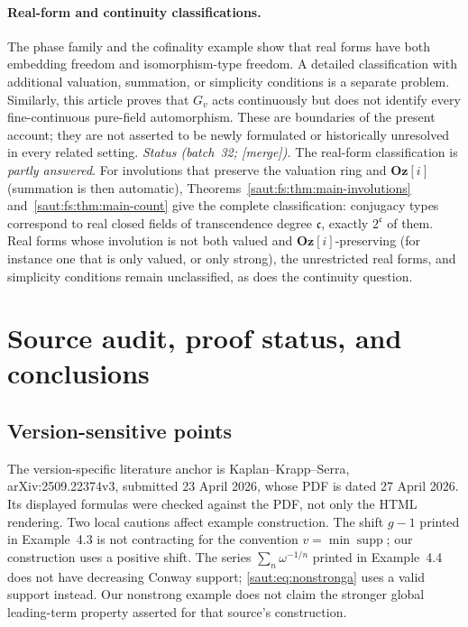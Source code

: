 \documentclass[11pt]{article}
\theoremstyle{definition}
\theoremstyle{remark}
\newcommand{\supp}{\operatorname{supp}}
\newcommand{\Oz}{\mathbf{Oz}}
\newcommand{\cc}{\mathfrak c}
\newcommand{\mergetag}{\textup{[merge]}}
\numberwithin{equation}{section}
\begin{document}
\paragraph{Real-form and continuity classifications.}
The phase family and the cofinality example show that real forms have both
embedding freedom and isomorphism-type freedom. A detailed classification
with additional valuation, summation, or simplicity conditions is a separate
problem. Similarly, this article proves that $G_v$ acts continuously but
does not identify every fine-continuous pure-field automorphism. These are
boundaries of the present account; they are not asserted to be newly
formulated or historically unresolved in every related setting.
\emph{Status (batch~32; \mergetag).} The real-form classification is
\emph{partly answered}. For involutions that preserve the valuation ring and
$\Oz[i]$ (summation is then automatic), Theorems~\ref{saut:fs:thm:main-involutions}
and~\ref{saut:fs:thm:main-count} give the complete classification: conjugacy types
correspond to real closed fields of transcendence degree $\cc$, exactly $2^{\cc}$ of
them. Real forms whose involution is not both valued and $\Oz[i]$-preserving (for
instance one that is only valued, or only strong), the unrestricted real forms, and
simplicity conditions remain unclassified, as does the continuity question.

\section{Source audit, proof status, and conclusions}\label{saut:sec:audit}

\subsection{Version-sensitive points}

The version-specific literature anchor is Kaplan--Krapp--Serra,
arXiv:2509.22374v3, submitted 23 April 2026, whose PDF is dated 27 April
2026. Its displayed formulas were checked against the PDF, not only the
HTML rendering. Two local cautions affect example construction. The
shift $g-1$ printed in Example~4.3 is not contracting for the convention
$v=\min\supp$; our construction uses a positive shift. The series
$\sum_n\omega^{-1/n}$ printed in Example~4.4 does not have decreasing
Conway support; \eqref{saut:eq:nonstronga} uses a valid support instead.
Our nonstrong example does not claim the stronger global leading-term
property asserted for that source's construction.
\end{document}
